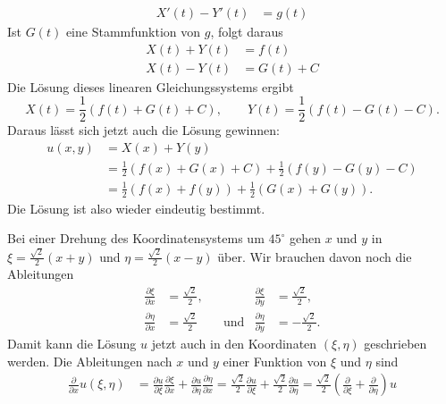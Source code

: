 \begin{loesung}
\begin{teilaufgaben}
\begin{align*}
X'(t)-Y'(t)&=g(t)
\end{align*}
Ist $G(t)$ eine Stammfunktion von $g$, folgt daraus
\begin{align*}
X(t)+Y(t)&=f(t)\\
X(t)-Y(t)&=G(t) + C
\end{align*}
Die Lösung dieses linearen Gleichungssystems ergibt
\[
X(t)=\frac12(f(t)+G(t)+C),\qquad 
Y(t)=\frac12(f(t)-G(t)-C).
\]
Daraus lässt sich jetzt auch die Lösung gewinnen:
\begin{align*}
u(x,y)&=X(x)+Y(y)
\\
&=
\frac12(f(x)+G(x)+C)
+
\frac12(f(y)-G(y)-C)
\\
&=
\frac12(f(x)+f(y))+\frac12(G(x)+G(y)).
\end{align*}
Die Lösung ist also wieder eindeutig bestimmt.
\item
Bei einer Drehung des Koordinatensystems um $45^\circ$ gehen
$x$ und $y$ in $\xi=\frac{\sqrt{2}}2(x+y)$ und $\eta=\frac{\sqrt{2}}2(x-y)$
über.
Wir brauchen davon noch die Ableitungen
\[
\begin{aligned}
\frac{\partial\xi}{\partial x}
&=
\frac{\sqrt{2}}{2},
&&&
\frac{\partial\xi}{\partial y}
&=
\frac{\sqrt{2}}{2},
\\
\frac{\partial\eta}{\partial x}
&=
\frac{\sqrt{2}}{2}
&&\text{und}&
\frac{\partial\eta}{\partial y}
&=
-\frac{\sqrt{2}}{2}.
\end{aligned}
\]
Damit kann die Lösung $u$ jetzt auch in den Koordinaten $(\xi,\eta)$
geschrieben werden. Die Ableitungen nach $x$ und $y$
einer Funktion von $\xi$
und $\eta$ sind
\begin{align*}
\frac{\partial}{\partial x}u(\xi,\eta)
&=
\frac{\partial u}{\partial \xi}\frac{\partial \xi}{\partial x}
+
\frac{\partial u}{\partial \eta}\frac{\partial \eta}{\partial x}
=
\frac{\sqrt{2}}2\frac{\partial u}{\partial\xi}
+\frac{\sqrt{2}}2\frac{\partial u}{\partial\eta}
=
\frac{\sqrt{2}}2\left(\frac{\partial}{\partial \xi}+\frac{\partial}{\partial\eta}\right)u

\end{align*}
\end{teilaufgaben}
\end{loesung}
